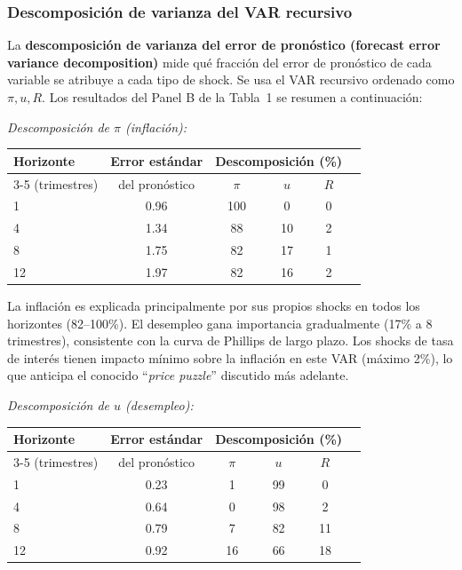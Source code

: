 \documentclass[12pt]{article}
\begin{document}
\subsubsection{Descomposici\'on de varianza del VAR recursivo}

La \textbf{descomposici\'on de varianza del error de pron\'ostico (forecast error variance decomposition)} mide qu\'e fracci\'on del error de pron\'ostico de cada variable se atribuye a cada tipo de shock. Se usa el VAR recursivo ordenado como $\pi, u, R$. Los resultados del Panel B de la Tabla~1 se resumen a continuaci\'on:

\medskip
\textit{Descomposici\'on de $\pi$ (inflaci\'on):}
\begin{center}
\begin{tabular}{lccccc}
\toprule
Horizonte & Error est\'andar & \multicolumn{3}{c}{Descomposici\'on (\%)} \\
\cmidrule(lr){3-5}
(trimestres) & del pron\'ostico & $\pi$ & $u$ & $R$ \\
\midrule
1  & 0.96 & 100 & 0  & 0  \\
4  & 1.34 & 88  & 10 & 2  \\
8  & 1.75 & 82  & 17 & 1  \\
12 & 1.97 & 82  & 16 & 2  \\
\bottomrule
\end{tabular}
\end{center}

\begin{hallazgo}
La inflaci\'on es explicada principalmente por sus propios shocks en todos los horizontes (82--100\%). El desempleo gana importancia gradualmente (17\% a 8 trimestres), consistente con la curva de Phillips de largo plazo. Los shocks de tasa de inter\'es tienen impacto m\'inimo sobre la inflaci\'on en este VAR (m\'aximo 2\%), lo que anticipa el conocido ``\textit{price puzzle}'' discutido m\'as adelante.
\end{hallazgo}

\textit{Descomposici\'on de $u$ (desempleo):}
\begin{center}
\begin{tabular}{lccccc}
\toprule
Horizonte & Error est\'andar & \multicolumn{3}{c}{Descomposici\'on (\%)} \\
\cmidrule(lr){3-5}
(trimestres) & del pron\'ostico & $\pi$ & $u$ & $R$ \\
\midrule
1  & 0.23 & 1  & 99 & 0  \\
4  & 0.64 & 0  & 98 & 2  \\
8  & 0.79 & 7  & 82 & 11 \\
12 & 0.92 & 16 & 66 & 18 \\
\bottomrule
\end{tabular}
\end{center}
\end{document}
